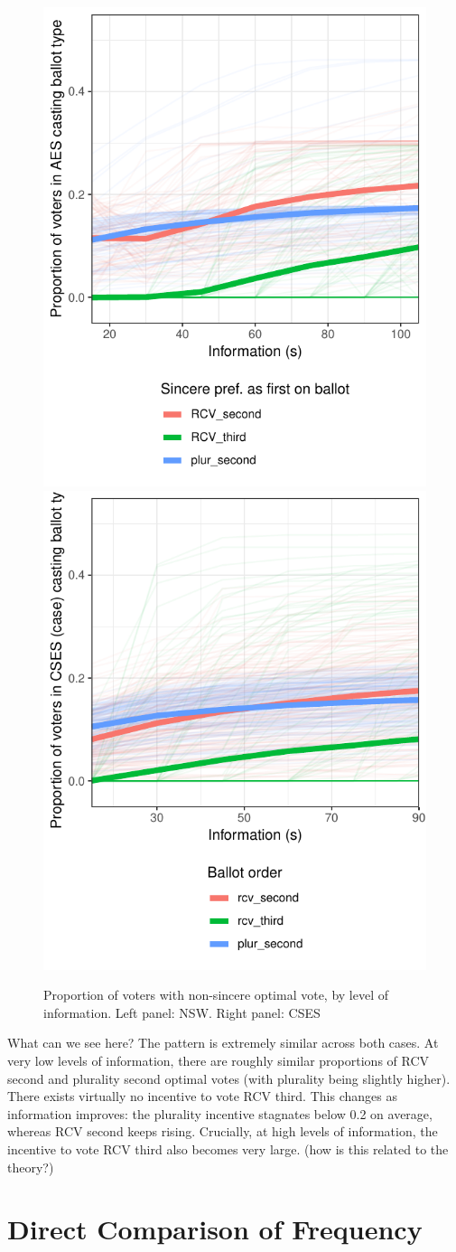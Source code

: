 \documentclass[11pt, letter, margin = 2 in]{article}
\begin{document}
\begin{figure}[!h]
	\centering
	\includegraphics[width = .45 \textwidth]{"../output/figures/australia_sv_freq"}
	\includegraphics[width = .45 \textwidth]{"../output/figures/cses_freq"}
	\caption{Proportion of voters with non-sincere optimal vote, by level of information. Left panel: NSW. Right panel: CSES}
	\label{fig:figure1}
\end{figure}

What can we see here?
The pattern is extremely similar across both cases. At very low levels of information, there are roughly similar proportions of RCV second and plurality second optimal votes (with plurality being slightly higher). There exists virtually no incentive to vote RCV third. This changes as information improves: the plurality incentive stagnates below 0.2 on average, whereas RCV second keeps rising. Crucially, at high levels of information, the incentive to vote RCV third also becomes very large. (how is this related to the theory?)

\section{Direct Comparison of Frequency}
\end{document}
